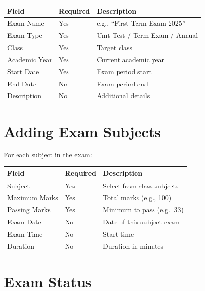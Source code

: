 \documentclass[12pt,a4paper]{report}
\begin{document}
\begin{longtable}{@{}p{4cm}p{3cm}p{6cm}@{}}
\toprule
\textbf{Field} & \textbf{Required} & \textbf{Description} \\
\midrule
\endhead
Exam Name & Yes & e.g., ``First Term Exam 2025'' \\
Exam Type & Yes & Unit Test / Term Exam / Annual \\
Class & Yes & Target class \\
Academic Year & Yes & Current academic year \\
Start Date & Yes & Exam period start \\
End Date & No & Exam period end \\
Description & No & Additional details \\
\bottomrule
\end{longtable}

\section{Adding Exam Subjects}

For each subject in the exam:

\begin{longtable}{@{}p{4cm}p{3cm}p{6cm}@{}}
\toprule
\textbf{Field} & \textbf{Required} & \textbf{Description} \\
\midrule
\endhead
Subject & Yes & Select from class subjects \\
Maximum Marks & Yes & Total marks (e.g., 100) \\
Passing Marks & Yes & Minimum to pass (e.g., 33) \\
Exam Date & No & Date of this subject exam \\
Exam Time & No & Start time \\
Duration & No & Duration in minutes \\
\bottomrule
\end{longtable}

\section{Exam Status}

\begin{center}
\end{center}
\end{document}
